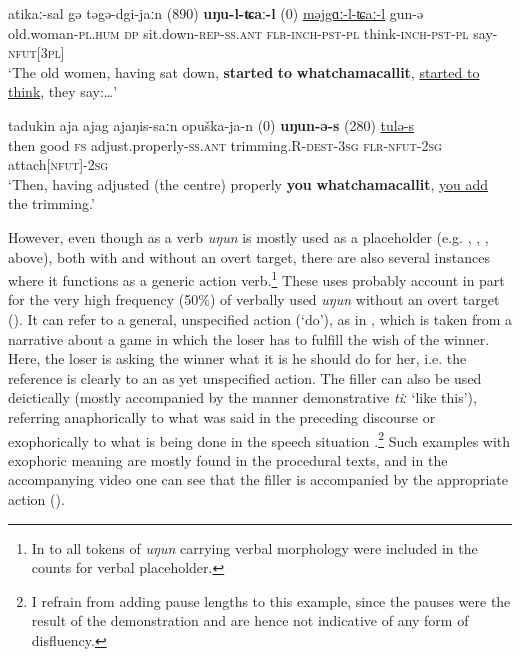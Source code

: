 \documentclass[output=paper]{langscibook}
\begin{document}
\ea \label{ex:pakendorf:32}
\gll atikaː-sal
	gə təgə-dgi-jaːn
	\textup{(890)}
	\textbf{uŋu-l-ʨaː-l}
	\textup{(0)}
	\uline{məjgɑː-l-ʨaː-l}
	gun-ə\\
	old.woman-\textsc{pl.hum}
	\textsc{dp}
	sit.down-\textsc{rep-ss.ant}
	{}
	\textsc{flr-inch-pst-pl}
	{}
	think-\textsc{inch-pst-pl}
	say-\textsc{nfut[3pl]}\\
\glt ‘The old women, having sat down, \textbf{started} \textbf{to} \textbf{whatchamacallit}, \uline{started to think}, they say:…’ 
\z


\ea \label{ex:pakendorf:33}
\gll tadukin
	aja
	ajag
	ajaŋis-saːn
	opuška-ja-n
	\textup{(0)}
	\textbf{uŋun-ə-s}
	\textup{(280)}
	\uline{tulə-s}\\
	then good \textsc{fs} adjust.properly-\textsc{ss.ant} trimming.R-\textsc{dest-3sg} {} \textsc{flr-nfut-2sg} {} attach\textsc{[nfut]-2sg}\\
\glt ‘Then, having adjusted (the centre) properly \textbf{you} \textbf{whatchamacallit}, \uline{you add} the trimming.’ 
\z

However, even though as a verb \textit{uŋun} is mostly used as a placeholder (e.g. , , ,  above), both with and without an overt target, there are also several instances where it functions as a generic action verb.\footnote{In  to  all tokens of \textit{uŋun} carrying verbal morphology were included in the counts for verbal placeholder.} These uses probably account in part for the very high frequency (50\%) of verbally used \textit{uŋun} without an overt target (). It can refer to a general, unspecified action (‘do’), as in , which is taken from a narrative about a game in which the loser has to fulfill the wish of the winner. Here, the loser is asking the winner what it is he should do for her, i.e. the reference is clearly to an as yet unspecified action. The filler can also be used deictically (mostly accompanied by the manner demonstrative \textit{tiː} ‘like this’), referring anaphorically to what was said in the preceding discourse  or exophorically to what is being done in the speech situation .\footnote{I refrain from adding pause lengths to this example, since the pauses were the result of the demonstration and are hence not indicative of any form of disfluency.} Such examples with exophoric meaning are mostly found in the procedural texts, and in the accompanying video one can see that the filler is accompanied by the appropriate action (). 
\end{document}
